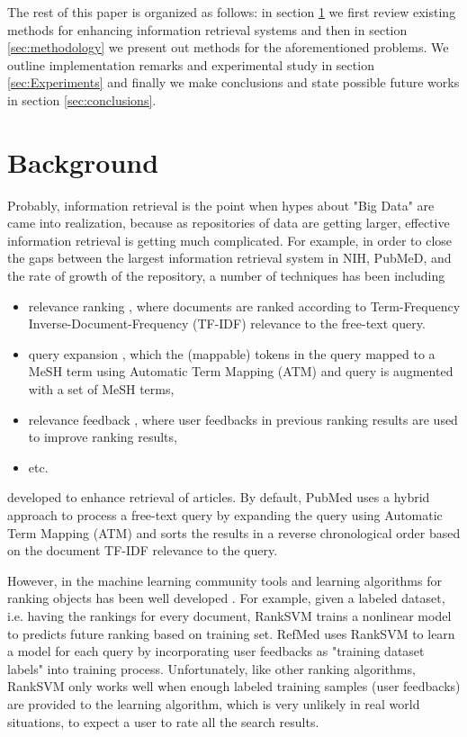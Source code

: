 \documentclass[twoside,11pt]{article}
\begin{document}
The rest of this paper is organized as follows: in section \ref{sec:background} we first review existing methods for enhancing information retrieval systems and then in section \ref{sec:methodology} we present out methods for the aforementioned problems. We outline implementation remarks and experimental study in section \ref{sec:Experiments} and finally we make conclusions and state possible future works in section \ref{sec:conclusions}.



\section{Background} \label{sec:background}
Probably, information retrieval is the point when hypes about "Big Data" are came into realization, because as repositories of data are getting larger, effective information retrieval is getting much complicated. For example, in order to close the gaps between the largest information retrieval system in NIH, PubMeD, and the rate of growth of the repository, a number of techniques has been including
\begin{itemize}
\item relevance ranking \cite{ranking-medline}, where documents are ranked according to Term-Frequency Inverse-Document-Frequency (TF-IDF) relevance to the free-text query.
\item query expansion \cite{mesh-query}, which the (mappable) tokens in the query mapped to a MeSH term using Automatic Term Mapping (ATM) \cite{pubmed-atm} and query is augmented with a set of MeSH terms,
\item relevance feedback \cite{refmed}, where user feedbacks in previous ranking results are used to improve ranking results,
\item etc. \cite{pubmed-survey}
\end{itemize}
developed to enhance retrieval of articles. By default, PubMed uses a hybrid approach to process a free-text query \cite{pubmed-help} by expanding the query using Automatic Term Mapping (ATM) \cite{pubmed-atm} and sorts the results in a reverse chronological order based on the document TF-IDF relevance to the query.

However, in the machine learning community tools and learning algorithms for ranking objects has been well developed \cite{yahoo-rank-challange}. For example, given a labeled dataset, i.e. having the rankings for every document, RankSVM \citep{svm-rank-j} trains a nonlinear model to predicts future ranking based on training set. RefMed \cite{refmed} uses RankSVM to learn a model for each query by incorporating user feedbacks as "training dataset labels" into training process. Unfortunately, like other ranking algorithms, RankSVM only works well when enough labeled training samples (user feedbacks) are provided to the learning algorithm, which is very unlikely in real world situations, to expect a user to rate all the search results.
\end{document}
